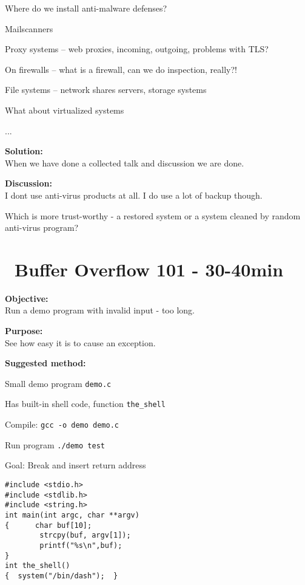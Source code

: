 \documentclass[a4paper,11pt,notitlepage]{report}
\begin{document}
Where do we install anti-malware defenses?

\begin{list2}
\item Mailscanners
\item Proxy systems -- web proxies, incoming, outgoing, problems with TLS?
\item On firewalls -- what is a firewall, can we do inspection, really?!
\item File systems -- network shares servers, storage systems
\item What about virtualized systems
\item ...
\end{list2}


{\bf Solution:}\\
When we have done a collected talk and discussion we are done.

{\bf Discussion:}\\
I dont use anti-virus products at all. I do use a lot of backup though.

Which is more trust-worthy - a restored system or a system cleaned by random anti-virus program?

\chapter{\faInfoCircle\ Buffer Overflow 101 - 30-40min}
\label{ex:bufferoverflow}


{\bf Objective:}\\
Run a demo program with invalid input - too long.

{\bf Purpose:}\\
See how easy it is to cause an exception.

{\bf Suggested method:}\\

\begin{list2}
\item Small demo program \verb+demo.c+
\item Has built-in shell code, function \verb+the_shell+
\item Compile:
\verb+gcc -o demo demo.c+
\item Run program
\verb+./demo test+
\item Goal: Break and insert return address
\end{list2}

\begin{verbatim}
#include <stdio.h>
#include <stdlib.h>
#include <string.h>
int main(int argc, char **argv)
{      char buf[10];
        strcpy(buf, argv[1]);
        printf("%s\n",buf);
}
int the_shell()
{  system("/bin/dash");  }
\end{verbatim}
\end{document}
